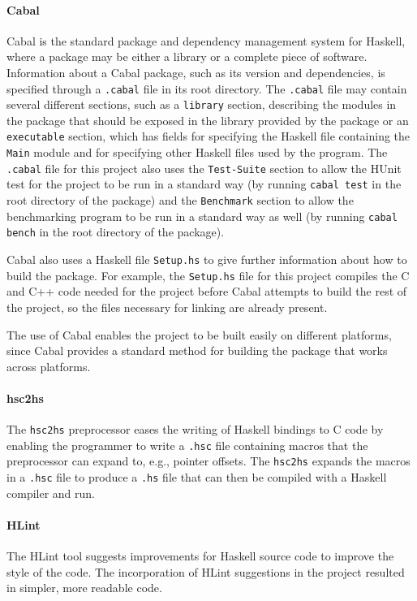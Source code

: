 \documentclass[12pt,a4paper,twoside,openright]{report}
\begin{document}
\paragraph{Cabal}{
Cabal is the standard package and dependency management system for Haskell,
where a package may be either a library or a complete piece of software.
Information about a Cabal package, such as its version and dependencies,
is specified through a \verb,.cabal, file in its root directory.
The \verb,.cabal, file may contain several different sections, such as a
\verb,library, section, describing the modules in the package that should be
exposed in the library provided by the package or an \verb,executable, section,
which has fields for specifying the Haskell file containing the \verb,Main,
module and for specifying other Haskell files used by the program.
The \verb,.cabal, file for this project also uses the \verb,Test-Suite, section
to allow the HUnit test for the project to be run in a standard way (by running
\verb,cabal test, in the root directory of the package) and the \verb,Benchmark,
section to allow the benchmarking program to be run in a standard way as well
(by running \verb,cabal bench, in the root directory of the package).

Cabal also uses a Haskell file \verb,Setup.hs, to give further information
about how to build the package. For example, the \verb,Setup.hs, file
for this project compiles the C and C++ code needed for the project before
Cabal attempts to build the rest of the project, so the files necessary
for linking are already present.

The use of Cabal enables the project to be built easily on different platforms,
since Cabal provides a standard method for building the package that works
across platforms.}

\paragraph{hsc2hs}{
The \verb,hsc2hs, preprocessor eases the writing of Haskell bindings to C
code by enabling the programmer to write a \verb,.hsc, file containing
macros that the preprocessor can expand to, e.g., pointer offsets. The
\verb,hsc2hs, expands the macros in a \verb,.hsc, file to produce a
\verb,.hs, file that can then be compiled with a Haskell compiler and run.
}

\paragraph{HLint}{
The HLint tool suggests improvements for Haskell source code to improve
the style of the code. The incorporation of HLint suggestions in
the project resulted in simpler, more readable code.
}
\end{document}
